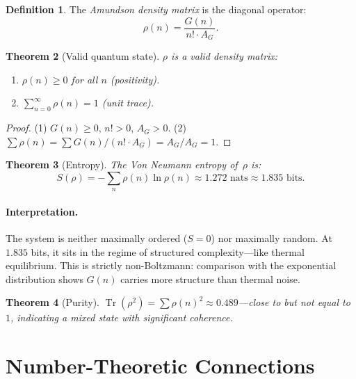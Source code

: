 \documentclass[11pt,a4paper]{article}
\newtheorem{theorem}{Theorem}[section]
\theoremstyle{definition}
\newtheorem{definition}[theorem]{Definition}
\theoremstyle{remark}
\newcommand{\AG}{A_G}
\newcommand{\Tr}{\operatorname{Tr}}
\begin{document}
\begin{definition}\label{def:density}
The \emph{Amundson density matrix} is the diagonal operator:
\begin{equation}\label{eq:density}
  \rho(n) = \frac{G(n)}{n!\cdot\AG}.
\end{equation}
\end{definition}

\begin{theorem}[Valid quantum state]\label{thm:quantum}
$\rho$ is a valid density matrix:
\begin{enumerate}
  \item $\rho(n)\ge 0$ for all $n$ \textup{(positivity)}.
  \item $\sum_{n=0}^{\infty}\rho(n)=1$ \textup{(unit trace)}.
\end{enumerate}
\end{theorem}

\begin{proof}
(1) $G(n)\ge 0$, $n!>0$, $\AG>0$. (2) $\sum\rho(n) = \sum G(n)/(n!\cdot\AG)=\AG/\AG=1$.
\end{proof}

\begin{theorem}[Entropy]\label{thm:entropy}
The Von Neumann entropy of~$\rho$ is:
\begin{equation}\label{eq:entropy}
  S(\rho) = -\sum_{n}\rho(n)\ln\rho(n) \approx 1.272\text{ nats} \approx 1.835\text{ bits}.
\end{equation}
\end{theorem}

\paragraph{Interpretation.}
The system is neither maximally ordered ($S=0$) nor maximally random. At $1.835$ bits, it sits in the regime of structured complexity---like thermal equilibrium. This is strictly non-Boltzmann: comparison with the exponential distribution shows $G(n)$ carries more structure than thermal noise.

\begin{theorem}[Purity]\label{thm:purity}
$\Tr(\rho^{2})=\sum\rho(n)^{2}\approx 0.489$---close to but not equal to~$1$, indicating a mixed state with significant coherence.
\end{theorem}

\section{Number-Theoretic Connections}\label{sec:numtheory}
\end{document}
